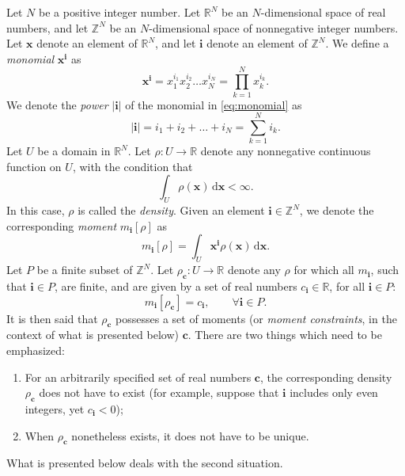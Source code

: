 \documentclass[12pt]{amsart}
\numberwithin{equation}{section}
\newcommand\BS{\boldsymbol}
\newcommand\dif{\,\mathrm{d}}
\begin{document}
Let $N$ be a positive integer number. Let $\mathbb R^N$ be an
$N$-dimensional space of real numbers, and let $\mathbb Z^N$ be an
$N$-dimensional space of nonnegative integer numbers. Let $\BS x$
denote an element of $\mathbb R^N$, and let $\BS i$ denote an element
of $\mathbb Z^N$. We define a {\em monomial} $\BS x^{\BS i}$ as
%
\begin{equation}
\label{eq:monomial}
\BS x^{\BS i}=x_1^{i_1}x_2^{i_2}\ldots x_N^{i_N}=\prod_{k=1}^N x_k^{i_k}.
\end{equation}
%
We denote the {\em power} $|\BS i|$ of the monomial in
\eqref{eq:monomial} as
%
\begin{equation}
\label{eq:monomial_power}
|\BS i|=i_1+i_2+\ldots+i_N=\sum_{k=1}^N i_k.
\end{equation}
%
Let $U$ be a domain in $\mathbb R^N$. Let $\rho:U\to\mathbb R$ denote
any nonnegative continuous function on $U$, with the condition that
%
\begin{equation}
\int_U\rho(\BS x)\dif\BS x<\infty.
\end{equation}
%
In this case, $\rho$ is called the {\em density}. Given an element
$\BS i\in\mathbb Z^N$, we denote the corresponding {\em moment}
$m_{\BS i}[\rho]$ as
%
\begin{equation}
m_{\BS i}[\rho]=\int_U\BS x^{\BS i}\rho(\BS x)\dif\BS x.
\end{equation}
%
Let $P$ be a finite subset of $\mathbb Z^N$. Let $\rho_{\BS
  c}:U\to\mathbb R$ denote any $\rho$ for which all $m_{\BS i}$, such
that $\BS i\in P$, are finite, and are given by a set of real numbers
$c_{\BS i}\in\mathbb R$, for all $\BS i\in P$:
%
\begin{equation}
m_{\BS i}[\rho_{\BS c}]=c_{\BS i},\qquad\forall \BS i\in P.
\end{equation}
%
It is then said that $\rho_{\BS c}$ possesses a set of moments (or
{\em moment constraints}, in the context of what is presented below)
$\BS c$. There are two things which need to be emphasized:
%
\begin{enumerate}
\item For an arbitrarily specified set of real numbers $\BS c$, the
  corresponding density $\rho_{\BS c}$ does not have to exist (for
  example, suppose that $\BS i$ includes only even integers, yet
  $c_{\BS i}<0$);
\item When $\rho_{\BS c}$ nonetheless exists, it does not have to be
  unique.
\end{enumerate}
%
What is presented below deals with the second situation.
\end{document}
